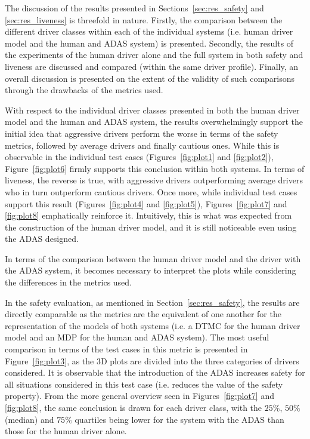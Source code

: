 The discussion of the results presented in Sections~\ref{sec:res_safety} and \ref{sec:res_liveness} is threefold in nature. Firstly, the comparison between the different driver classes within each of the individual systems (i.e. human driver model and the human and ADAS system) is presented. Secondly, the results of the experiments of the human driver alone and the full system in both safety and liveness are discussed and compared (within the same driver profile). Finally, an overall discussion is presented on the extent of the validity of such comparisons through the drawbacks of the metrics used.

With respect to the individual driver classes presented in both the human driver model and the human and ADAS system, the results overwhelmingly support the initial idea that aggressive drivers perform the worse in terms of the safety metrics, followed by average drivers and finally cautious ones. While this is observable in the individual test cases (Figures~\ref{fig:plot1} and \ref{fig:plot2}), Figure~\ref{fig:plot6} firmly supports this conclusion within both systems. In terms of liveness, the reverse is true, with aggressive drivers outperforming average drivers who in turn outperform cautious drivers. Once more, while individual test cases support this result (Figures~\ref{fig:plot4} and \ref{fig:plot5}), Figures~\ref{fig:plot7} and \ref{fig:plot8} emphatically reinforce it. Intuitively, this is what was expected from the construction of the human driver model, and it is still noticeable even using the ADAS designed.

In terms of the comparison between the human driver model and the driver with the ADAS system, it becomes necessary to interpret the plots while considering the differences in the metrics used. 

In the safety evaluation, as mentioned in Section~\ref{sec:res_safety}, the results are directly comparable as the metrics are the equivalent of one another for the representation of the models of both systems (i.e. a DTMC for the human driver model and an MDP for the human and ADAS system). The most useful comparison in terms of the test cases in this metric is presented in Figure~\ref{fig:plot3}, as the 3D plots are divided into the three categories of drivers considered. It is observable that the introduction of the ADAS increases safety for all situations considered in this test case (i.e. reduces the value of the safety property). From the more general overview seen in Figures~\ref{fig:plot7} and \ref{fig:plot8}, the same conclusion is drawn for each driver class, with the $25\%$, $50\%$ (median) and $75\%$ quartiles being lower for the system with the ADAS than those for the human driver alone. 

